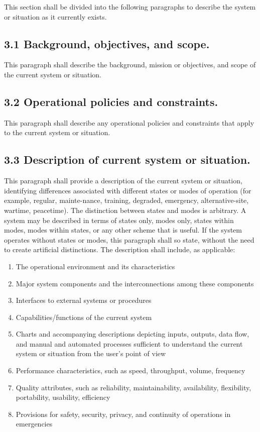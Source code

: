 This section shall be divided into the following paragraphs to describe
the system or situation as it currently exists.

\subsection{3.1 Background, objectives, and scope.}

This paragraph shall describe the background, mission or objectives, and
scope of the current system or situation.

\subsection{3.2 Operational policies and constraints.}

This paragraph shall describe any operational policies and constraints
that apply to the current system or situation.

\subsection{3.3 Description of current system or situation.}

This paragraph shall provide a description of the current system or
situation, identifying differences associated with different states or
modes of operation (for example, regular, mainte-nance, training,
degraded, emergency, alternative-site, wartime, peacetime). The
distinction between states and modes is arbitrary. A system may be
described in terms of states only, modes only, states within modes,
modes within states, or any other scheme that is useful. If the system
operates without states or modes, this paragraph shall so state, without
the need to create artificial distinctions. The description shall
include, as applicable:

\begin{enumerate}
\itemsep1pt\parskip0pt
\item
  The operational environment and its characteristics
\item
  Major system components and the interconnections among these
  components
\item
  Interfaces to external systems or procedures
\item
  Capabilities/functions of the current system
\item
  Charts and accompanying descriptions depicting inputs, outputs, data
  flow, and manual and automated processes sufficient to understand the
  current system or situation from the user's point of view
\item
  Performance characteristics, such as speed, throughput, volume,
  frequency
\item
  Quality attributes, such as reliability, maintainability,
  availability, flexibility, portability, usability, efficiency
\item
  Provisions for safety, security, privacy, and continuity of operations
  in emergencies
\end{enumerate}

